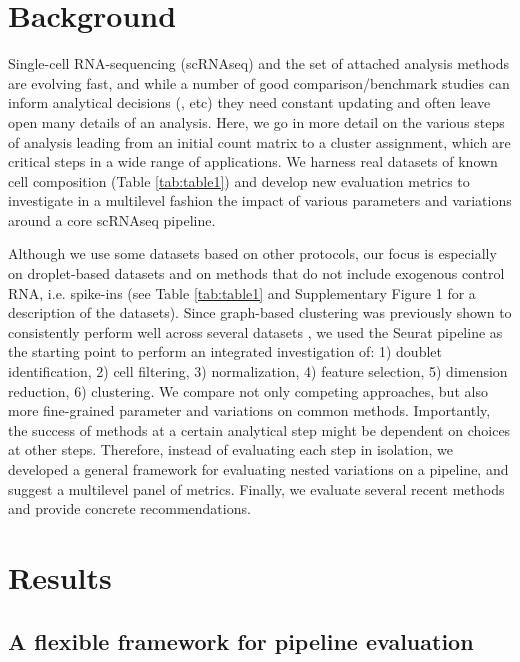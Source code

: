 \documentclass{bmcart}
\begin{document}

\section*{Background}

Single-cell RNA-sequencing (scRNAseq) and the set of attached analysis methods are evolving fast, and while a number of good comparison/benchmark studies can inform analytical decisions (\citealp{duoClustering2018}, etc) they need constant updating and often leave open many details of an analysis. Here, we go in more detail on the various steps of analysis leading from an initial count matrix to a cluster assignment, which are critical steps in a wide range of applications. We harness real datasets of known cell composition (Table \ref{tab:table1}) and develop new evaluation metrics to investigate in a multilevel fashion the impact of various parameters and variations around a core scRNAseq pipeline.

Although we use some datasets based on other protocols, our focus is especially on droplet-based datasets and on methods that do not include exogenous control RNA, i.e. spike-ins (see Table \ref{tab:table1} and Supplementary Figure 1 for a description of the datasets). Since graph-based clustering  \cite{satijaSeurat2015} was previously shown to consistently perform well across several datasets \cite{duoClustering2018,tianMixology2018}, we used the Seurat pipeline as the starting point to perform an integrated investigation of: 1) doublet identification, 2) cell filtering, 3) normalization, 4) feature selection, 5) dimension reduction, 6) clustering. We compare not only competing approaches, but also more fine-grained parameter and variations on common methods. Importantly, the success of methods at a certain analytical step might be dependent on choices at other steps. Therefore, instead of evaluating each step in isolation, we developed a general framework for evaluating nested variations on a pipeline, and suggest a multilevel panel of metrics. Finally, we evaluate several recent methods and provide concrete recommendations.

\section*{Results}

\subsection*{A flexible framework for pipeline evaluation}
\end{document}
